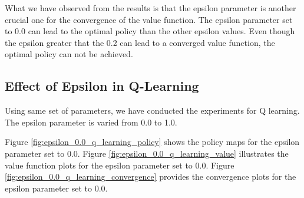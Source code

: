 \documentclass{assignment}
\begin{document}
What we have observed from the results is that the epsilon parameter is another crucial one for the convergence of the value function. The epsilon parameter set to 0.0 can lead to the optimal policy than the other epsilon values. Even though the epsilon greater that the 0.2 can lead to a converged value function, the optimal policy can not be achieved.

\subsection{Effect of Epsilon in Q-Learning}
Using same set of parameters, we have conducted the experiments for Q learning. The epsilon parameter is varied from 0.0 to 1.0.

Figure \ref{fig:epsilon_0.0_q_learning_policy} shows the policy maps for the epsilon parameter set to 0.0. Figure \ref{fig:epsilon_0.0_q_learning_value} illustrates the value function plots for the epsilon parameter set to 0.0. Figure \ref{fig:epsilon_0.0_q_learning_convergence} provides the convergence plots for the epsilon parameter set to 0.0.
\end{document}
